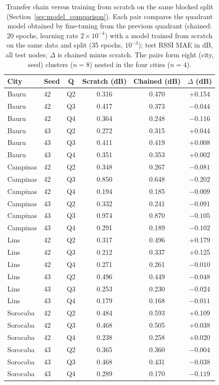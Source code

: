 \begin{table}[t]
\caption{Transfer chain versus training from scratch on the same blocked split (Section~\ref{sec:model_comparison}). Each pair compares the quadrant model obtained by fine-tuning from the previous quadrant (chained: 20 epochs, learning rate $2\times10^{-4}$) with a model trained from scratch on the same data and split (35 epochs, $10^{-3}$); test RSSI MAE in dB, all test nodes; $\Delta$ is chained minus scratch. The pairs form eight (city, seed) clusters ($n=8$) nested in the four cities ($n=4$).}
\label{tab:transfer_control}
\centering
\small
\setlength{\tabcolsep}{4pt}
\begin{tabular}{llcccc}
\toprule
City & Seed & Q & Scratch (dB) & Chained (dB) & $\Delta$ (dB) \\
\midrule
Bauru & 42 & Q2 & 0.316 & 0.470 & +0.154 \\
Bauru & 42 & Q3 & 0.417 & 0.373 & $-0.044$ \\
Bauru & 42 & Q4 & 0.364 & 0.248 & $-0.116$ \\
Bauru & 43 & Q2 & 0.272 & 0.315 & +0.044 \\
Bauru & 43 & Q3 & 0.411 & 0.419 & +0.008 \\
Bauru & 43 & Q4 & 0.351 & 0.353 & +0.002 \\
Campinas & 42 & Q2 & 0.348 & 0.267 & $-0.081$ \\
Campinas & 42 & Q3 & 0.850 & 0.648 & $-0.202$ \\
Campinas & 42 & Q4 & 0.194 & 0.185 & $-0.009$ \\
Campinas & 43 & Q2 & 0.332 & 0.241 & $-0.091$ \\
Campinas & 43 & Q3 & 0.974 & 0.870 & $-0.105$ \\
Campinas & 43 & Q4 & 0.291 & 0.189 & $-0.102$ \\
Lins & 42 & Q2 & 0.317 & 0.496 & +0.179 \\
Lins & 42 & Q3 & 0.212 & 0.337 & +0.125 \\
Lins & 42 & Q4 & 0.271 & 0.261 & $-0.010$ \\
Lins & 43 & Q2 & 0.496 & 0.449 & $-0.048$ \\
Lins & 43 & Q3 & 0.253 & 0.230 & $-0.024$ \\
Lins & 43 & Q4 & 0.179 & 0.168 & $-0.011$ \\
Sorocaba & 42 & Q2 & 0.484 & 0.593 & +0.109 \\
Sorocaba & 42 & Q3 & 0.468 & 0.505 & +0.038 \\
Sorocaba & 42 & Q4 & 0.238 & 0.258 & +0.020 \\
Sorocaba & 43 & Q2 & 0.365 & 0.360 & $-0.004$ \\
Sorocaba & 43 & Q3 & 0.468 & 0.431 & $-0.038$ \\
Sorocaba & 43 & Q4 & 0.289 & 0.170 & $-0.119$ \\
\bottomrule
\end{tabular}
\end{table}
